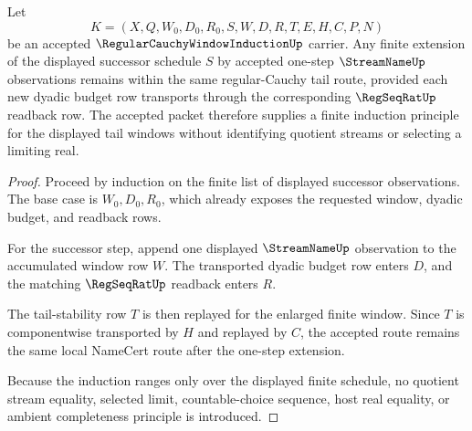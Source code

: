 \begin{theorem}
\label{thm:regular-cauchy-window-induction-tail-closure}
Let
$$
K=(X,Q,W_0,D_0,R_0,S,W,D,R,T,E,H,C,P,N)
$$
be an accepted $\RegularCauchyWindowInductionUp$ carrier. Any finite extension of the displayed successor schedule $S$ by accepted one-step $\StreamNameUp$ observations remains within the same regular-Cauchy tail route, provided each new dyadic budget row transports through the corresponding $\RegSeqRatUp$ readback row. The accepted packet therefore supplies a finite induction principle for the displayed tail windows without identifying quotient streams or selecting a limiting real.
\end{theorem}
\begin{proof}
Proceed by induction on the finite list of displayed successor observations. The base case is $W_0,D_0,R_0$, which already exposes the requested window, dyadic budget, and readback rows.

For the successor step, append one displayed $\StreamNameUp$ observation to the accumulated window row $W$. The transported dyadic budget row enters $D$, and the matching $\RegSeqRatUp$ readback enters $R$.

The tail-stability row $T$ is then replayed for the enlarged finite window. Since $T$ is componentwise transported by $H$ and replayed by $C$, the accepted route remains the same local NameCert route after the one-step extension.

Because the induction ranges only over the displayed finite schedule, no quotient stream equality, selected limit, countable-choice sequence, host real equality, or ambient completeness principle is introduced.
\end{proof}

